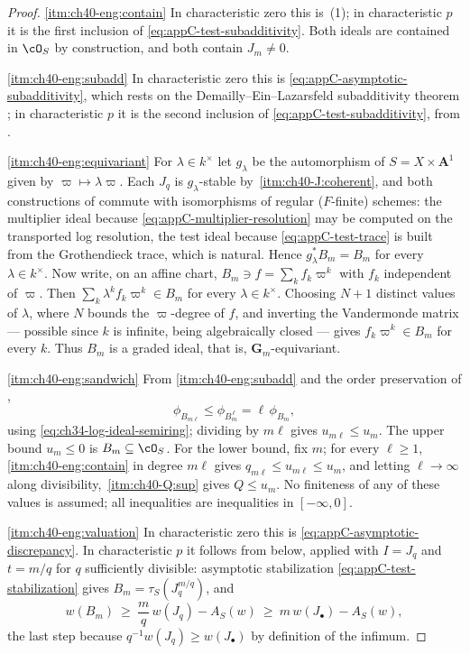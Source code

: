 \begin{proof}
\cref{itm:ch40-eng:contain}  In characteristic zero this is
\,(1); in characteristic
$p$ it is the first inclusion of
\eqref{eq:appC-test-subadditivity}.  Both ideals are contained in
$\cO_S$ by construction, and both contain $J_m\ne0$.

\cref{itm:ch40-eng:subadd}  In characteristic zero this is
\eqref{eq:appC-asymptotic-subadditivity}, which rests on the
Demailly--Ein--Lazarsfeld subadditivity theorem
; in characteristic $p$ it is the
second inclusion of \eqref{eq:appC-test-subadditivity}, from
\cite{MustataTest}.

\cref{itm:ch40-eng:equivariant}  For $\lambda\in k^\times$ let
$g_\lambda$ be the automorphism of $S=X\times\mathbf A^1$ given by
$\varpi\mapsto\lambda\varpi$.  Each $J_q$ is $g_\lambda$-stable by
\,\cref{itm:ch40-J:coherent}, and both constructions
of  commute with isomorphisms of regular
($F$-finite) schemes: the multiplier ideal because
\eqref{eq:appC-multiplier-resolution} may be computed on the transported log
resolution, the test ideal because \eqref{eq:appC-test-trace} is built from
the Grothendieck trace, which is natural.  Hence
$g_\lambda^*B_m=B_m$ for every $\lambda\in k^\times$.  Now write, on an
affine chart, $B_m\ni f=\sum_{k}f_k\varpi^k$ with $f_k$ independent of
$\varpi$.  Then $\sum_k\lambda^kf_k\varpi^k\in B_m$ for every
$\lambda\in k^\times$.  Choosing $N+1$ distinct values of $\lambda$,
where $N$ bounds the $\varpi$-degree of $f$, and inverting the
Vandermonde matrix --- possible since $k$ is infinite, being algebraically
closed --- gives $f_k\varpi^k\in B_m$ for every $k$.  Thus $B_m$ is a
graded ideal, that is, $\mathbf G_m$-equivariant.

\cref{itm:ch40-eng:sandwich}  From \cref{itm:ch40-eng:subadd} and the order
preservation of ,
\[
 \phi_{B_{m\ell}}\le\phi_{B_m^{\,\ell}}=\ell\,\phi_{B_m},
\]
using \eqref{eq:ch34-log-ideal-semiring}; dividing by $m\ell$ gives
$u_{m\ell}\le u_m$.  The upper bound $u_m\le0$ is
$B_m\subseteq\cO_S$.  For the lower bound, fix $m$; for every
$\ell\ge1$, \cref{itm:ch40-eng:contain} in degree $m\ell$ gives
$q_{m\ell}\le u_{m\ell}\le u_m$, and letting $\ell\to\infty$ along
divisibility, \,\cref{itm:ch40-Q:sup} gives
$Q\le u_m$.  No finiteness of any of these values is assumed; all
inequalities are inequalities in $[-\infty,0]$.

\cref{itm:ch40-eng:valuation}  In characteristic zero this is
\eqref{eq:appC-asymptotic-discrepancy}.  In characteristic $p$ it follows
from  below, applied with $I=J_q$ and
$t=m/q$ for $q$ sufficiently divisible: asymptotic stabilization
\eqref{eq:appC-test-stabilization} gives $B_m=\tau_S(J_q^{m/q})$, and
\[
 w(B_m)\ \ge\ \frac mq\,w(J_q)-A_S(w)\ \ge\ m\,w(J_\bullet)-A_S(w),
\]
the last step because $q^{-1}w(J_q)\ge w(J_\bullet)$ by definition of the
infimum.
\end{proof}

